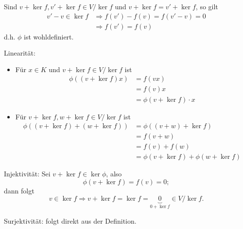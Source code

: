  		Sind $ v+\ker f, v'+\ker f \in V/\ker f$ und $ v+\ker f = v'+\ker f $, so gilt
 		\begin{align*}
 			v'-v \in \ker f & \Rightarrow f(v')-f(v) = f(v'-v) = 0 \\
 			                & \Rightarrow f(v') = f(v)
 		\end{align*}
 		d.h. $ \phi $ ist wohldefiniert.

 		Linearität:
 		\begin{itemize}
 			\item Für $ x\in K $ und $ v+\ker f \in V/\ker f $ ist
 			      \begin{align*}
 			      	\phi( (v+\ker f)x) & = f(vx)                  \\
 			      	                   & = f(v)x                  \\
 			      	                   & = \phi (v+\ker f)\cdot x
 			      \end{align*}
 			\item Für $ v+\ker f, w+\ker f\in V/\ker f $ ist
 			      \begin{align*}
 			      	\phi ((v+\ker f)+(w+\ker f) ) & = \phi((v+w)+\ker f)           \\
 			      	                              & =f(v+w)                        \\
 			      	                              & = f(v)+f(w)                    \\
 			      	                              & =\phi(v+\ker f)+\phi(w+\ker f)
 			      \end{align*}
 		\end{itemize}
 		Injektivität:
 		Sei $ v+\ker f\in \ker \phi $, also
 		\[
 			\phi(v+\ker f)= f(v) = 0;
 		\]
 		dann folgt
 		\[
 			v\in \ker f \Rightarrow v+\ker f = \ker f = \underbrace{0}_{0+\ker f}\in V/\ker f.
 		\]

 		Surjektivität:
 		folgt direkt aus der Definition.
